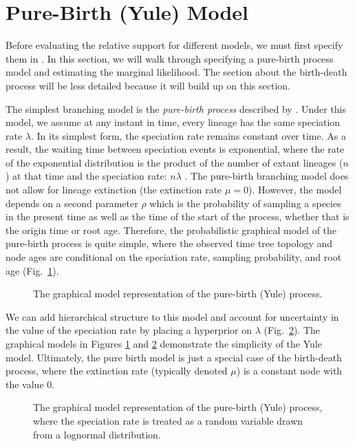 

\bigskip
\section{Pure-Birth (Yule) Model}\label{yuleModSec}

Before evaluating the relative support for different models, we must first specify them in \Rev.
In this section, we will walk through specifying a pure-birth process model and estimating the marginal likelihood. 
The section about the birth-death process will be less detailed because it will build up on this section.

The simplest branching model is the \emph{pure-birth process} described by \cite{Yule1925}. 
Under this model, we assume at any instant in time, every lineage has the same speciation rate $\lambda$.
In its simplest form, the speciation rate remains constant over time. 
As a result, the waiting time between speciation events is exponential, where the rate of the exponential distribution is the product of the number of extant lineages ($n$) at that time and the speciation rate: $n\lambda$ \citep{Yule1925,Aldous2001,Hoehna2014a}. 
The pure-birth branching model does not allow for lineage extinction (\IE the extinction rate $\mu=0$). 
However, the model depends on a second parameter $\rho$ which is the probability of sampling a species in the present time as well as the time of the start of the process, whether that is the origin time or root age.
Therefore, the probabilistic graphical model of the pure-birth process is quite simple, where the observed time tree topology and node ages are conditional on the speciation rate, sampling probability, and root age (Fig.~\ref{yuleGMfig}).
\begin{figure}[h!]
\centering
{}
\caption{\small The graphical model representation of the pure-birth (Yule) process.}
\label{yuleGMfig}
\end{figure}

We can add hierarchical structure to this model and account for uncertainty in the value of the speciation rate by placing a hyperprior on $\lambda$ (Fig.~\ref{yuleGMfig2}). 
The graphical models in Figures \ref{yuleGMfig} and \ref{yuleGMfig2} demonstrate the simplicity of the Yule model. 
Ultimately, the pure birth model is just a special case of the birth-death process, where the extinction rate (typically denoted $\mu$) is a constant node with the value 0. 
\begin{figure}[h!]
\centering
{}
\caption{\small The graphical model representation of the pure-birth (Yule) process, where the speciation rate is treated as a random variable drawn from a lognormal distribution.}
\label{yuleGMfig2}
\end{figure}

